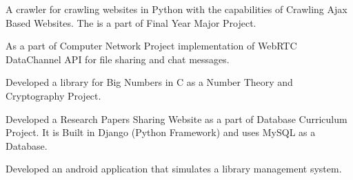 \begin{resume}
\begin{position}
A crawler for crawling websites in Python with the capabilities of Crawling Ajax   
Based Websites. The is a part of Final Year Major Project.
\end{position}

\begin{position}
As a part of Computer Network Project implementation of WebRTC DataChannel API for file sharing and chat messages.
\end{position}


\begin{position}
Developed a library for Big Numbers in C as a Number Theory and Cryptography                         Project.
\end{position}

\begin{position}
Developed a Research Papers Sharing Website as a part of Database Curriculum
Project. It is Built in Django (Python Framework) and uses MySQL as a Database.
\end{position}

\dates{}
\begin{position}
Developed an android application that simulates a library management system.
\end{position}








\end{resume}
